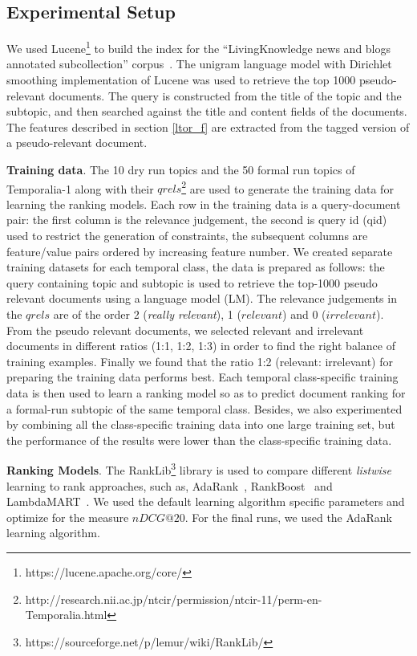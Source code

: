 \documentclass{sig-alternate}
\begin{document}
\subsection{Experimental Setup}
\label{setup}
We used Lucene\footnote{https://lucene.apache.org/core/} to build the index for the ``LivingKnowledge news and blogs annotated subcollection'' corpus~\cite{mioverview}. The unigram language model with Dirichlet smoothing implementation of Lucene was used to retrieve the top 1000 pseudo-relevant documents. The query is constructed from the title of the topic and the subtopic, and then searched against the title and content fields of the documents. The features described in section \ref{ltor_f} are extracted from the tagged version of a pseudo-relevant document.

\textbf{Training data}. The 10 dry run topics and the 50 formal run topics of Temporalia-1 along with their $qrels$\footnote{http://research.nii.ac.jp/ntcir/permission/ntcir-11/perm-en-Temporalia.html} are used to generate the training data for learning the ranking models. Each row in the training data is a query-document pair: the first column is the relevance judgement, the second is query id (qid) used to restrict the generation of constraints, the subsequent columns are feature/value pairs ordered by increasing feature number. We created separate training datasets for each temporal class, the data is prepared as follows: the query containing topic and subtopic is used to retrieve the top-1000 pseudo relevant documents using a language model (LM). The relevance judgements in the $qrels$ are of the order 2 (\textit{really relevant}), 1 ($relevant$) and 0 ($irrelevant$). From the pseudo relevant documents, we selected relevant and irrelevant documents in different ratios (1:1, 1:2, 1:3) in order to find the right balance of training examples. Finally we found that the ratio 1:2 (relevant: irrelevant) for preparing the training data performs best. Each temporal class-specific training data is then used to learn a ranking model so as to predict document ranking for a formal-run subtopic of the same temporal class. Besides, we also experimented by combining all the class-specific training data into one large training set, but the performance of the results were lower than the class-specific training data.

\textbf{Ranking Models}. The RankLib\footnote{https://sourceforge.net/p/lemur/wiki/RankLib/} library is used to compare different \textit{listwise} learning to rank approaches, such as, AdaRank~\cite{adarank}, RankBoost~\cite{rankboost} and LambdaMART~\cite{lambdamart}. We used the default learning algorithm specific parameters and optimize for the measure $nDCG@20$. For the final runs, we used the AdaRank learning algorithm.
\end{document}
